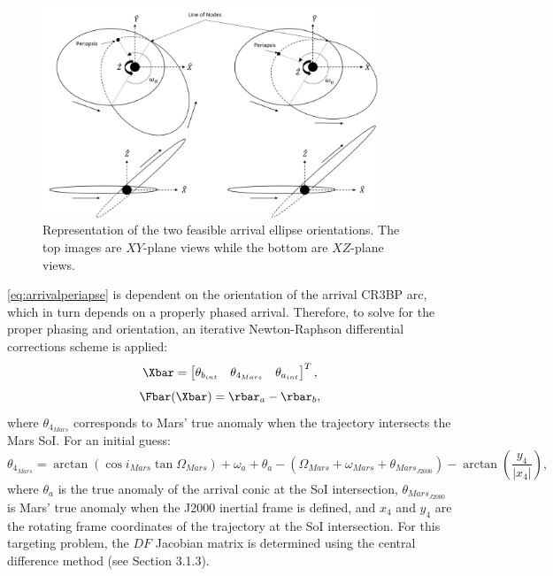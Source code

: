 \begin{figure}[ht]
    \centering
    \includegraphics[width=0.9\textwidth]{figures/orientation.jpg}
    \caption{Representation of the two feasible arrival ellipse orientations. The top images are $XY$-plane views while the bottom are $XZ$-plane views.}
    \label{fig:orientation}
\end{figure}

\cref{eq:arrivalperiapse} is dependent on the orientation of the arrival CR3BP arc, which in turn
depends on a properly phased arrival. Therefore, to solve for the proper phasing and orientation,
an iterative Newton-Raphson differential corrections scheme is applied:
\begin{equation}
    \Xbar=\begin{bmatrix}   \theta_{b_{int}}    &   \theta_{4_{Mars}}   &   \theta_{a_{int}}    \end{bmatrix}^{T},
    \label{eq:MMATfreevar}
\end{equation}
\begin{equation}
    \Fbar(\Xbar)=\rbar_{a}-\rbar_{b},
    \label{eq:MMATconst}
\end{equation}
where $\theta_{4_{Mars}}$ corresponds to Mars' true anomaly when the trajectory intersects the Mars
SoI. For an initial guess:
\begin{equation}
    \theta_{4_{Mars}}=\arctan(\cos i_{Mars}\tan\Omega_{Mars})+\omega_{a}+\theta_{a}-(\Omega_{Mars}+\omega_{Mars}+\theta_{Mars_{J2000}})-\arctan(\frac{y_{4}}{|x_{4}|}),
    \label{eq:arrivalepoch}
\end{equation}
where $\theta_{a}$ is the true anomaly of the arrival conic at the SoI intersection,
$\theta_{Mars_{J2000}}$ is Mars' true anomaly when the J2000 inertial frame is defined, and $x_{4}$
and $y_{4}$ are the rotating frame coordinates of the trajectory at the SoI intersection. For this
targeting problem, the $DF$ Jacobian matrix is determined using the central difference method (see
Section 3.1.3).

